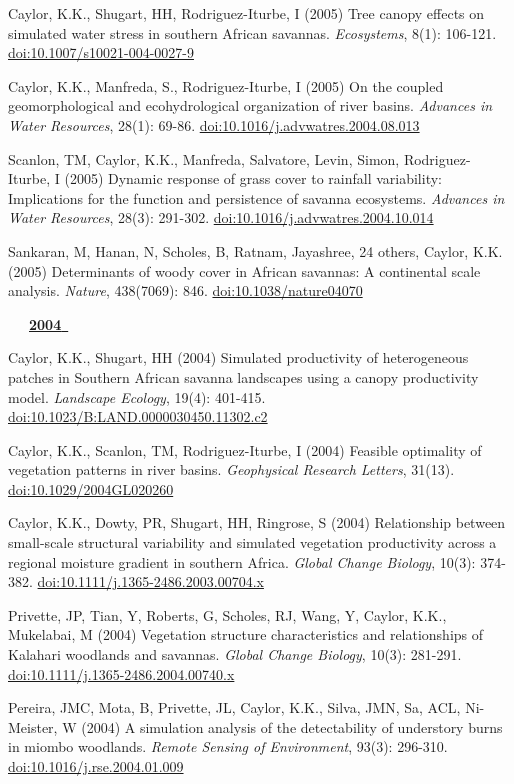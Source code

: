 \begin{etaremune}
\item Caylor, K.K., Shugart, HH, Rodriguez-Iturbe, I (2005) Tree canopy effects on simulated water stress in southern African savannas. \emph{Ecosystems}, 8(1): 106-121. \href{https://doi.org/10.1007/s10021-004-0027-9}{doi:10.1007/s10021-004-0027-9}
\item Caylor, K.K., Manfreda, S., Rodriguez-Iturbe, I (2005) On the coupled geomorphological and ecohydrological organization of river basins. \emph{Advances in Water Resources}, 28(1): 69-86. \href{https://doi.org/10.1016/j.advwatres.2004.08.013}{doi:10.1016/j.advwatres.2004.08.013}
\item Scanlon, TM, Caylor, K.K., Manfreda, Salvatore, Levin, Simon, Rodriguez-Iturbe, I (2005) Dynamic response of grass cover to rainfall variability: Implications for the function and persistence of savanna ecosystems. \emph{Advances in Water Resources}, 28(3): 291-302. \href{https://doi.org/10.1016/j.advwatres.2004.10.014}{doi:10.1016/j.advwatres.2004.10.014}
\item Sankaran, M, Hanan, N, Scholes, B, Ratnam, Jayashree, 24 others, Caylor, K.K. (2005) Determinants of woody cover in African savannas: A continental scale analysis. \emph{Nature}, 438(7069): 846. \href{https://doi.org/10.1038/nature04070}{doi:10.1038/nature04070}

\mbox{\ \ \ \underline{\textbf{2004 }}}

\item Caylor, K.K., Shugart, HH (2004) Simulated productivity of heterogeneous patches in Southern African savanna landscapes using a canopy productivity model. \emph{Landscape Ecology}, 19(4): 401-415. \href{https://doi.org/10.1023/B:LAND.0000030450.11302.c2}{doi:10.1023/B:LAND.0000030450.11302.c2}
\item Caylor, K.K., Scanlon, TM, Rodriguez-Iturbe, I (2004) Feasible optimality of vegetation patterns in river basins. \emph{Geophysical Research Letters}, 31(13). \href{https://doi.org/10.1029/2004GL020260}{doi:10.1029/2004GL020260}
\item Caylor, K.K., Dowty, PR, Shugart, HH, Ringrose, S (2004) Relationship between small-scale structural variability and simulated vegetation productivity across a regional moisture gradient in southern Africa. \emph{Global Change Biology}, 10(3): 374-382. \href{https://doi.org/10.1111/j.1365-2486.2003.00704.x}{doi:10.1111/j.1365-2486.2003.00704.x}
\item Privette, JP, Tian, Y, Roberts, G, Scholes, RJ, Wang, Y, Caylor, K.K., Mukelabai, M (2004) Vegetation structure characteristics and relationships of Kalahari woodlands and savannas. \emph{Global Change Biology}, 10(3): 281-291. \href{https://doi.org/10.1111/j.1365-2486.2004.00740.x}{doi:10.1111/j.1365-2486.2004.00740.x}
\item Pereira, JMC, Mota, B, Privette, JL, Caylor, K.K., Silva, JMN, Sa, ACL, Ni-Meister, W (2004) A  simulation analysis of the detectability of understory burns in miombo woodlands. \emph{Remote Sensing of Environment}, 93(3): 296-310. \href{https://doi.org/10.1016/j.rse.2004.01.009}{doi:10.1016/j.rse.2004.01.009}


\end{etaremune}
